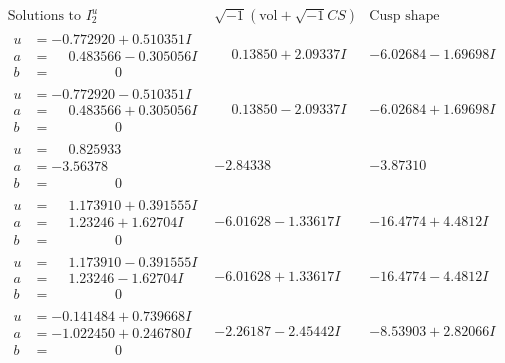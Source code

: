 \documentclass[1p]{elsarticle_modified}
\theoremstyle{definition}
\newcommand{\I}{\sqrt{-1}}
\begin{document}
$$\begin{array}{c|c|c}  
\text{Solutions to }I^u_{2}& \I (\text{vol} + \sqrt{-1}CS) & \text{Cusp shape}\\
 \hline 
\begin{aligned}
u &= -0.772920 + 0.510351 I \\
a &= \phantom{-}0.483566 - 0.305056 I \\
b &= \phantom{-0.000000 } 0\end{aligned}
 & \phantom{-}0.13850 + 2.09337 I & -6.02684 - 1.69698 I \\ \hline\begin{aligned}
u &= -0.772920 - 0.510351 I \\
a &= \phantom{-}0.483566 + 0.305056 I \\
b &= \phantom{-0.000000 } 0\end{aligned}
 & \phantom{-}0.13850 - 2.09337 I & -6.02684 + 1.69698 I \\ \hline\begin{aligned}
u &= \phantom{-}0.825933\phantom{ +0.000000I} \\
a &= -3.56378\phantom{ +0.000000I} \\
b &= \phantom{-0.000000 } 0\end{aligned}
 & -2.84338\phantom{ +0.000000I} & -3.87310\phantom{ +0.000000I} \\ \hline\begin{aligned}
u &= \phantom{-}1.173910 + 0.391555 I \\
a &= \phantom{-}1.23246 + 1.62704 I \\
b &= \phantom{-0.000000 } 0\end{aligned}
 & -6.01628 - 1.33617 I & -16.4774 + 4.4812 I \\ \hline\begin{aligned}
u &= \phantom{-}1.173910 - 0.391555 I \\
a &= \phantom{-}1.23246 - 1.62704 I \\
b &= \phantom{-0.000000 } 0\end{aligned}
 & -6.01628 + 1.33617 I & -16.4774 - 4.4812 I \\ \hline\begin{aligned}
u &= -0.141484 + 0.739668 I \\
a &= -1.022450 + 0.246780 I \\
b &= \phantom{-0.000000 } 0\end{aligned}
 & -2.26187 - 2.45442 I & -8.53903 + 2.82066 I \\ \hline\begin{aligned}

\end{aligned}
\end{array}$$
\end{document}
